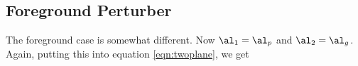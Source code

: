 \subsection{Foreground Perturber}
\label{sec:foreground}
The foreground case is somewhat different. Now $\al_1 = \al_p$ and $\al_2 = \al_g$. Again, putting this into equation \ref{eqn:twoplane}, we get
  
  